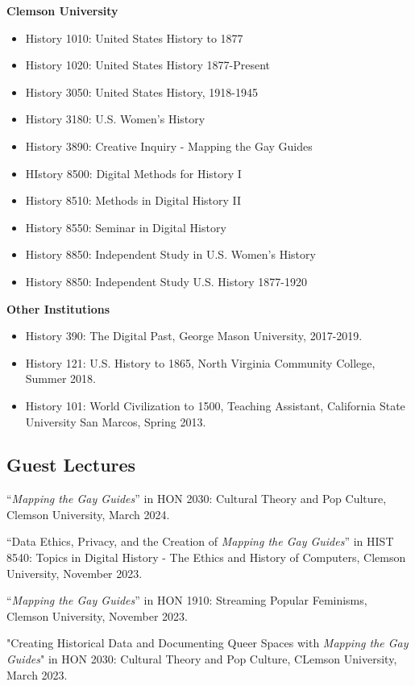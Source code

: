 \documentclass[11pt]{article}
\begin{document}
\textbf{Clemson University}
\begin{itemize}
  \itemsep0em 
  \item History 1010: United States History to 1877
  \item History 1020: United States History 1877-Present
  \item History 3050: United States History, 1918-1945
  \item History 3180: U.S. Women's History
  \item History 3890: Creative Inquiry - Mapping the Gay Guides
  \item HIstory 8500: Digital Methods for History I
  \item History 8510: Methods in Digital History II
  \item History 8550: Seminar in Digital History
  \item History 8850: Independent Study in U.S. Women's History
  \item History 8850: Independent Study U.S. History 1877-1920
\end{itemize}
\textbf{Other Institutions}
\begin{itemize}
  \itemsep0em 
  \item History 390: The Digital Past, George Mason University, 2017-2019.
  \item History 121: U.S. History to 1865, North Virginia Community College, Summer 2018.
  \item History 101: World Civilization to 1500, Teaching Assistant, California State University San Marcos, Spring 2013.
\end{itemize}

\subsection{Guest Lectures}
``\emph{Mapping the Gay Guides}'' in HON 2030: Cultural Theory and Pop Culture, Clemson University, March 2024.

``Data Ethics, Privacy, and the Creation of \emph{Mapping the Gay Guides}'' in HIST 8540: Topics in Digital History - The Ethics and History of Computers, Clemson University, November 2023.

``\emph{Mapping the Gay Guides}'' in HON 1910: Streaming Popular Feminisms, Clemson University, November 2023.

"Creating Historical Data and Documenting Queer Spaces with \emph{Mapping the Gay Guides}" in HON 2030: Cultural Theory and Pop Culture, CLemson University, March 2023.
\end{document}
